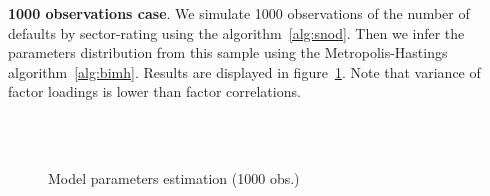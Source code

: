 \documentclass[11pt,fleqn]{book} %
\begin{document}
\begin{example}
	\textbf{1000 observations case}. We simulate 1000 observations of the number 
	of defaults by sector-rating using the algorithm~\ref{alg:snod}. Then we 
	infer the parameters distribution from this sample using the 
	Metropolis-Hastings algorithm~\ref{alg:bimh}. Results are displayed in 
	figure~\ref{fig:calib1}. Note that variance of factor loadings is lower than 
	factor correlations.
	\begin{figure}[!ht]
		\centering
		\hfill
		\\
		\\
		\caption{Model parameters estimation (1000 obs.)}
		\label{fig:calib1}
	\end{figure}


\end{example}
\end{document}
